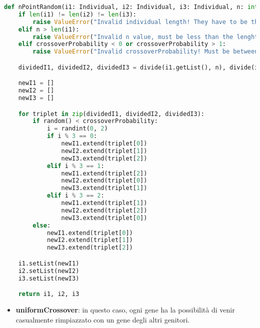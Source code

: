 \documentclass{article}
\begin{document}
\begin{lstlisting}[language=Python]
def nPointRandom(i1: Individual, i2: Individual, i3: Individual, n: int, crossoverProbability: float) -> tuple[Individual, Individual, Individual]:
    if len(i1) != len(i2) != len(i3):
        raise ValueError("Invalid individual length! They have to be the same.")
    elif n > len(i1):
        raise ValueError("Invalid n value, must be less than the lenght of the individual!")
    elif crossoverProbability < 0 or crossoverProbability > 1:
        raise ValueError("Invalid crossoverProbability! Must be between 0 and 1.")

    dividedI1, dividedI2, dividedI3 = divide(i1.getList(), n), divide(i2.getList(), n), divide(i3.getList(), n)

    newI1 = []
    newI2 = []
    newI3 = []

    for triplet in zip(dividedI1, dividedI2, dividedI3):
        if random() < crossoverProbability:
            i = randint(0, 2)
            if i % 3 == 0:
                newI1.extend(triplet[0])
                newI2.extend(triplet[1])
                newI3.extend(triplet[2])
            elif i % 3 == 1:
                newI1.extend(triplet[2])
                newI2.extend(triplet[0])
                newI3.extend(triplet[1])
            elif i % 3 == 2:
                newI1.extend(triplet[1])
                newI2.extend(triplet[2])
                newI3.extend(triplet[0])
        else:
            newI1.extend(triplet[0])
            newI2.extend(triplet[1])
            newI3.extend(triplet[2])

    i1.setList(newI1)
    i2.setList(newI2)
    i3.setList(newI3)

    return i1, i2, i3
        \end{lstlisting}

\pagebreak


\begin{itemize}
\item\textbf{uniformCrossover}: in questo caso, ogni gene ha la possibilità di venir casualmente rimpiazzato con un gene degli altri genitori.
\end{itemize}
\end{document}
